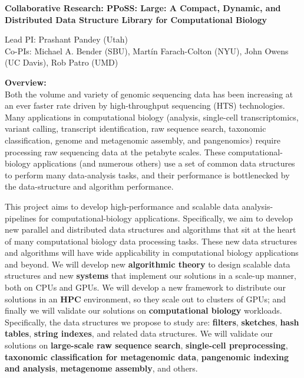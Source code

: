 
\begin{center}

\bf
\Large
Collaborative Research: PPoSS\@: Large: A Compact, Dynamic, and Distributed Data
Structure Library for Computational Biology

\small
Lead PI: Prashant Pandey (Utah)\\
Co-PIs: Michael A. Bender (SBU), Mart\'{i}n Farach-Colton (NYU), John Owens (UC Davis), Rob Patro (UMD)
\end{center}

\vspace{-0.3cm}

\noindent \textbf{\large Overview:}\\
Both the volume and variety of genomic sequencing data has been increasing at an ever faster rate driven by high-throughput sequencing (HTS) technologies. 
Many applications in computational biology (\kmer analysis, single-cell transcriptomics, variant calling, transcript identification, raw sequence search, taxonomic classification, genome and metagenomic assembly, and pangenomics) require processing raw sequencing data at the petabyte scales.
%
These computational-biology applications (and numerous others) use a set of common data structures to perform many data-analysis tasks, and their performance is bottlenecked by the data-structure and algorithm performance.

This project aims to develop high-performance and scalable data analysis-pipelines for computational-biology applications. Specifically, we aim to develop new parallel and distributed data structures and algorithms that sit at the heart of many computational biology data processing tasks. These new data structures and algorithms will have wide applicability in computational biology applications and beyond.
%
We will develop new \textbf{algorithmic theory} to design scalable data structures and new \textbf{systems} that implement our solutions in a scale-up manner, both on CPUs and GPUs. We will develop a new framework to distribute our solutions in an \textbf{HPC} environment, so they scale out to clusters of GPUs; and finally we will validate our solutions on \textbf{computational biology} workloads.
%
Specifically, the data structures we propose to study are: \textbf{filters}, \textbf{sketches}, \textbf{hash tables}, \textbf{string indexes}, and related data structures.  We will validate our solutions on \textbf{large-scale raw sequence search}, \textbf{single-cell preprocessing}, \textbf{taxonomic classification for metagenomic data}, \textbf{pangenomic indexing and analysis}, \textbf{metagenome assembly}, and others.

